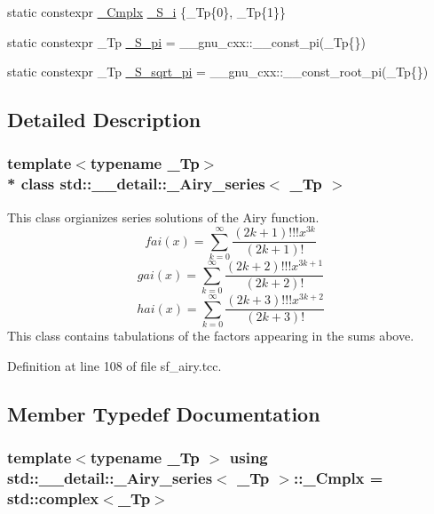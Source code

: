 \begin{DoxyCompactItemize}
\item 
static constexpr \hyperlink{classstd_1_1____detail_1_1__Airy__series_ab41161caa54609f4735987fbaed41d9d}{\+\_\+\+Cmplx} \hyperlink{classstd_1_1____detail_1_1__Airy__series_a4133b308af0c967a73c918af22c93b09}{\+\_\+\+S\+\_\+i} \{\+\_\+\+Tp\{0\}, \+\_\+\+Tp\{1\}\}
\item 
static constexpr \+\_\+\+Tp \hyperlink{classstd_1_1____detail_1_1__Airy__series_a9de354dae47d41acc60824681d864184}{\+\_\+\+S\+\_\+pi} = \+\_\+\+\_\+gnu\+\_\+cxx\+::\+\_\+\+\_\+const\+\_\+pi(\+\_\+\+Tp\{\})
\item 
static constexpr \+\_\+\+Tp \hyperlink{classstd_1_1____detail_1_1__Airy__series_a3fd1fba37ef8beb0d89854d4e58b8a38}{\+\_\+\+S\+\_\+sqrt\+\_\+pi} = \+\_\+\+\_\+gnu\+\_\+cxx\+::\+\_\+\+\_\+const\+\_\+root\+\_\+pi(\+\_\+\+Tp\{\})
\end{DoxyCompactItemize}


\subsection{Detailed Description}
\subsubsection*{template$<$typename \+\_\+\+Tp$>$\\*
class std\+::\+\_\+\+\_\+detail\+::\+\_\+\+Airy\+\_\+series$<$ \+\_\+\+Tp $>$}

This class orgianizes series solutions of the Airy function. \[ fai(x) = \sum_{k=0}^\infty \frac{(2k+1)!!!x^{3k}}{(2k+1)!} \] \[ gai(x) = \sum_{k=0}^\infty \frac{(2k+2)!!!x^{3k+1}}{(2k+2)!} \] \[ hai(x) = \sum_{k=0}^\infty \frac{(2k+3)!!!x^{3k+2}}{(2k+3)!} \] This class contains tabulations of the factors appearing in the sums above. 

Definition at line 108 of file sf\+\_\+airy.\+tcc.



\subsection{Member Typedef Documentation}
\subsubsection[{\texorpdfstring{\+\_\+\+Cmplx}{_Cmplx}}]{\setlength{\rightskip}{0pt plus 5cm}template$<$typename \+\_\+\+Tp $>$ using {\bf std\+::\+\_\+\+\_\+detail\+::\+\_\+\+Airy\+\_\+series}$<$ \+\_\+\+Tp $>$\+::{\bf \+\_\+\+Cmplx} =  std\+::complex$<$\+\_\+\+Tp$>$}\hypertarget{classstd_1_1____detail_1_1__Airy__series_ab41161caa54609f4735987fbaed41d9d}{}\label{classstd_1_1____detail_1_1__Airy__series_ab41161caa54609f4735987fbaed41d9d}


